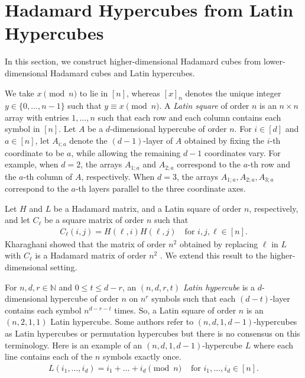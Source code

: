 \documentclass[11pt,oneside]{amsart}
\newcommand{\defn}[1]{\textit{#1}}
\begin{document}
{\section{Hadamard Hypercubes from Latin Hypercubes}\label{sec:revursive}
In this section, we construct higher-dimensional Hadamard cubes from lower-dimensional Hadamard cubes and Latin hypercubes.

We take $x \pmod n$ to lie in $[n]$, whereas $[x]_n$ denotes the unique integer $y \in \{0,\dots,n-1\}$ such that $y \equiv x \pmod n$.   
A \defn{Latin square} of order $n$ is an $n\times n$ array with entries $1,\ldots,n$ such that each row and each column contains each symbol in $[n]$.  Let $A$ be a $d$-dimensional hypercube of order $n$. 
For $i\in [d]$ and $a\in [n]$, let $A_{i;a}$ denote the $(d-1)$-layer of $A$ obtained by fixing the $i$-th coordinate to be $a$, while allowing the remaining $d-1$ coordinates vary. For example, when $d=2$, the arrays $A_{1;a}$ and  $A_{2;a}$ correspond to the $a$-th row and the $a$-th column of $A$, respectively. When $d=3$, the arrays $A_{1;a}, A_{2;a}, A_{3;a}$ correspond to the  $a$-th layers parallel to the three coordinate axes. 

Let $H$ and $L$ be a Hadamard matrix, and a Latin square of order $n$, respectively, and let $C_\ell$ be a square matrix of order $n$ such that 
\begin{align*}
    C_\ell (i,j) =H(\ell,i)H(\ell,j) \quad \text {for }i,j,\ell\in [n].
\end{align*}
Kharaghani showed that the matrix of order $n^2$ obtained by replacing $\ell$ in $L$ with $C_\ell$ is a Hadamard matrix of order $n^2$ \cite{MR810264}. 
We extend this result to the higher-dimensional setting.

For $n,d,r\in \mathbb{N}$ and $0\leq t\leq d-r$, an {\it $(n,d,r,t)$ Latin hypercube} is a $d$-dimensional hypercube of order  $n$ on $n^r$
symbols such that each $(d-t)$-layer contains each symbol $n^{d-r-t}$ times. So, a Latin square of order $n$ is an $(n,2,1,1)$ Latin hypercube. Some authors refer to $(n,d,1,d-1)$-hypercubes as  Latin hypercubes or permutation hypercubes but there is no consensus on this terminology.
Here is an example of an  $(n,d,1,d-1)$-hypercube $L$  where each line contains each of the $n$ symbols exactly once. 
\begin{align*}
L(i_1,\dots,i_d)=i_1+\dots+i_d \pmod n  & \text { for } i_1,\dots,i_{d}\in [n]. 
\end{align*}

}
\end{document}
